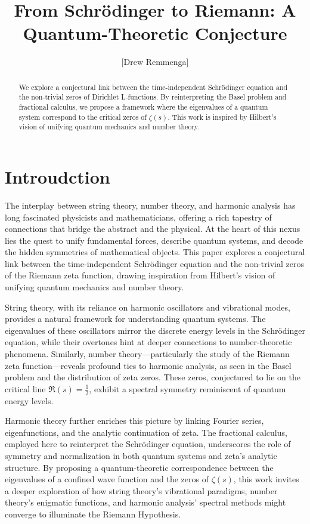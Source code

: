 \documentclass[10pt, oneside]{article}
\title{From Schrödinger to Riemann: A Quantum-Theoretic Conjecture}
\author{[Drew Remmenga]}
\begin{document}
\maketitle

\begin{abstract}
  We explore a conjectural link between the time-independent Schrödinger equation and the non-trivial zeros of Dirichlet L-functions. By reinterpreting the Basel problem and fractional calculus, we propose a framework where the eigenvalues of a quantum system correspond to the critical zeros of $\zeta(s)$. This work is inspired by Hilbert's vision of unifying quantum mechanics and number theory.
\end{abstract}
\section{Introudction}
The interplay between string theory, number theory, and harmonic analysis has long fascinated physicists and mathematicians, offering a rich tapestry of connections that bridge the abstract and the physical. At the heart of this nexus lies the quest to unify fundamental forces, describe quantum systems, and decode the hidden symmetries of mathematical objects. This paper explores a conjectural link between the time-independent Schrödinger equation and the non-trivial zeros of the Riemann zeta function, drawing inspiration from Hilbert's vision of unifying quantum mechanics and number theory.

String theory, with its reliance on harmonic oscillators and vibrational modes, provides a natural framework for understanding quantum systems. The eigenvalues of these oscillators mirror the discrete energy levels in the Schrödinger equation, while their overtones hint at deeper connections to number-theoretic phenomena. Similarly, number theory---particularly the study of the Riemann zeta function---reveals profound ties to harmonic analysis, as seen in the Basel problem and the distribution of zeta zeros. These zeros, conjectured to lie on the critical line $\Re(s) = \frac{1}{2}$, exhibit a spectral symmetry reminiscent of quantum energy levels.

Harmonic theory further enriches this picture by linking Fourier series, eigenfunctions, and the analytic continuation of zeta. The fractional calculus, employed here to reinterpret the Schrödinger equation, underscores the role of symmetry and normalization in both quantum systems and zeta's analytic structure. By proposing a quantum-theoretic correspondence between the eigenvalues of a confined wave function and the zeros of $\zeta(s)$, this work invites a deeper exploration of how string theory's vibrational paradigms, number theory's enigmatic functions, and harmonic analysis' spectral methods might converge to illuminate the Riemann Hypothesis.
\end{document}
